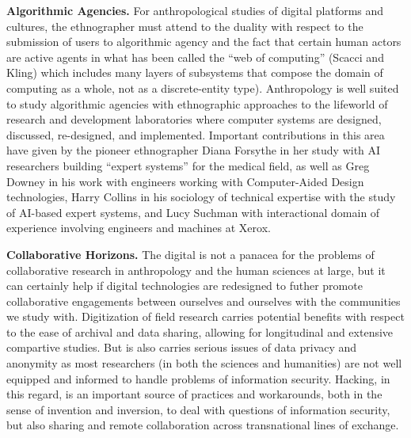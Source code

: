 \documentclass[10pt,letter,oneside]{scrartcl}
\begin{document}


{\bf Algorithmic Agencies.} For anthropological studies of digital platforms and
cultures, the ethnographer must attend to the duality with respect to the
submission of users to algorithmic agency and the fact that certain human actors
are active agents in what has been called the ``web of computing'' (Scacci and
Kling) which includes many layers of subsystems that compose the domain of
computing as a whole, not as a discrete-entity type).  Anthropology is well
suited to study algorithmic agencies with ethnographic approaches to the
lifeworld of research and development laboratories where computer systems are
designed, discussed, re-designed, and implemented. Important contributions in
this area have given by the pioneer ethnographer Diana Forsythe in her study
with AI researchers building ``expert systems'' for the medical field, as well
as Greg Downey in his work with engineers working with Computer-Aided Design
technologies, Harry Collins in his sociology of technical expertise with the
study of AI-based expert systems, and Lucy Suchman with interactional domain of
experience involving engineers and machines at Xerox. 



{\bf Collaborative Horizons.} The digital is not a panacea for the problems of
collaborative research in anthropology and the human sciences at large, but it
can certainly help if digital technologies are redesigned to futher promote
collaborative engagements between ourselves and ourselves with the communities
we study with. Digitization of field research carries potential benefits with
respect to the ease of archival and data sharing, allowing for longitudinal and
extensive compartive studies. But is also carries serious issues of data privacy
and anonymity as most researchers (in both the sciences and humanities) are not
well equipped and informed to handle problems of information security. Hacking,
in this regard, is an important source of practices and workarounds, both
in the sense of invention and inversion, to deal with questions of information 
security, but also sharing and remote collaboration across transnational lines 
of exchange.
\end{document}

